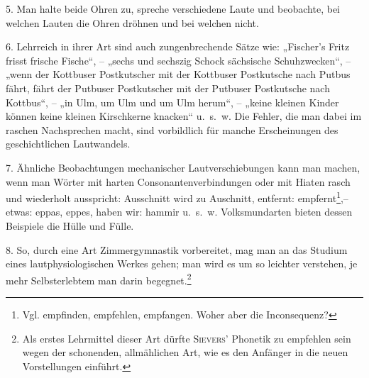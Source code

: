 5. Man halte beide Ohren zu, spreche verschiedene Laute und beobachte, bei welchen Lauten die Ohren dröhnen und bei welchen nicht.

6. Lehrreich in ihrer Art sind auch zungenbrechende Sätze wie: „Fischer’s Fritz frisst frische Fische“, – „sechs und sechszig Schock sächsische Schuhzwecken“, – „wenn der Kottbuser Postkutscher mit der Kottbuser Postkutsche nach Putbus fährt, fährt der Putbuser Postkutscher mit der Putbuser Post\-\label{sp.38}kutsche nach Kottbus“, – „in Ulm, um Ulm und um Ulm herum“, – „keine kleinen Kinder können keine kleinen Kirschkerne knacken“ u.~s.~w. Die Fehler, die man dabei im raschen Nachsprechen macht, sind vorbildlich für manche Erscheinungen des geschichtlichen Lautwandels. 

7. Ähnliche Beobachtungen mechanischer Lautverschiebungen kann man machen, wenn man Wörter mit harten Consonantenverbindungen oder mit Hiaten rasch und wiederholt ausspricht: Ausschnitt wird zu Au\-\label{fp.38}schnitt, entfernt: empfernt\footnote{Vgl. empfinden, empfehlen, empfangen. Woher aber die Inconsequenz?},– etwas: eppas, eppes, haben wir: hammir u.~s.~w.   Volksmundarten bieten dessen Beispiele die Hülle und Fülle. 

8. So, durch eine Art Zimmergymnastik vorbereitet, mag man an das Studium eines lautphysiologischen Werkes gehen; man wird es um so leichter verstehen, je mehr Selbsterlebtem man darin begegnet.\footnote{Als erstes Lehrmittel dieser Art dürfte \textsc{Sievers}’ Phonetik zu empfehlen sein wegen der schonenden, allmählichen Art, wie es den Anfänger in die neuen Vorstellungen einführt.}

